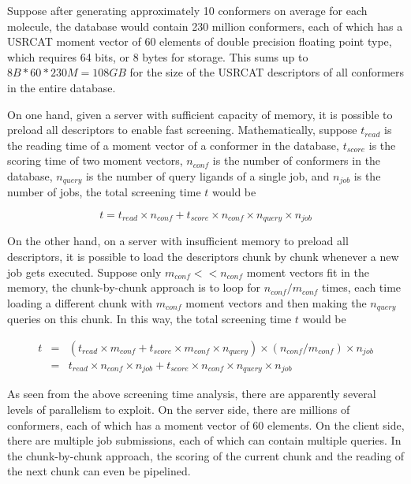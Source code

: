 \documentclass[a4,center,fleqn]{NAR}
\begin{document}
Suppose after generating approximately 10 conformers on average for each molecule, the database would contain 230 million conformers, each of which has a USRCAT moment vector of 60 elements of double precision floating point type, which requires 64 bits, or 8 bytes for storage. This sums up to $8B*60*230M=108GB$ for the size of the USRCAT descriptors of all conformers in the entire database.

On one hand, given a server with sufficient capacity of memory, it is possible to preload all descriptors to enable fast screening. Mathematically, suppose $t_{read}$ is the reading time of a moment vector of a conformer in the database, $t_{score}$ is the scoring time of two moment vectors, $n_{conf}$ is the number of conformers in the database, $n_{query}$ is the number of query ligands of a single job, and $n_{job}$ is the number of jobs, the total screening time $t$ would be

\begin{equation}
t=t_{read}\times n_{conf}+t_{score}\times n_{conf}\times n_{query}\times n_{job}
\label{time0}
\end{equation}

On the other hand, on a server with insufficient memory to preload all descriptors, it is possible to load the descriptors chunk by chunk whenever a new job gets executed. Suppose only $m_{conf} << n_{conf}$ moment vectors fit in the memory, the chunk-by-chunk approach is to loop for $n_{conf}/m_{conf}$ times, each time loading a different chunk with $m_{conf}$ moment vectors and then making the $n_{query}$ queries on this chunk. In this way, the total screening time $t$ would be

\begin{eqnarray}
t&=&(t_{read}\times m_{conf}+t_{score}\times m_{conf}\times n_{query})\times(n_{conf}/m_{conf})\times n_{job}\nonumber\\
 &=&t_{read}\times n_{conf}\times n_{job}+t_{score}\times n_{conf}\times n_{query}\times n_{job}
\label{time1}
\end{eqnarray}

As seen from the above screening time analysis, there are apparently several levels of parallelism to exploit. On the server side, there are millions of conformers, each of which has a moment vector of 60 elements. On the client side, there are multiple job submissions, each of which can contain multiple queries. In the chunk-by-chunk approach, the scoring of the current chunk and the reading of the next chunk can even be pipelined.
\end{document}
